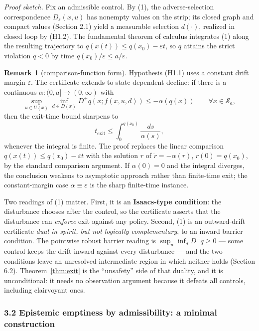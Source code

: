 \documentclass[10pt,twocolumn]{article}
\theoremstyle{definition}
\newtheorem{remark}{Remark}
\begin{document}
\emph{Proof sketch.} Fix an admissible control. By (1), the adverse-selection correspondence \(D_\varepsilon(x,u)\) has nonempty values on the strip; its closed graph and compact values (Section 2.1) yield a measurable selection \(d(\cdot)\), realized in closed loop by (H1.2). The fundamental theorem of calculus integrates (1) along the resulting trajectory to \(q(x(t)) \le q(x_0) - \varepsilon t\), so \(q\) attains the strict violation \(q < 0\) by time \(q(x_0)/\varepsilon \le a/\varepsilon\).

\begin{remark}[comparison-function form]\label{rem:comparison}
Hypothesis (H1.1) uses a constant drift margin \(\varepsilon\). The
certificate extends to state-dependent decline: if there is a continuous
\(\alpha:(0,a]\to(0,\infty)\) with
\[\sup_{u\in U(x)}\inf_{d\in D(x)} D^+q(x; f(x,u,d)) \le -\alpha(q(x)) \qquad \forall x\in\mathcal{S}_a,\]
then the exit-time bound sharpens to
\[t_{\mathrm{exit}} \le \int_0^{q(x_0)} \frac{ds}{\alpha(s)},\]
whenever the integral is finite. The proof replaces the linear comparison
\(q(x(t))\le q(x_0)-\varepsilon t\) with the solution \(r\) of
\(\dot r=-\alpha(r)\), \(r(0)=q(x_0)\), by the standard comparison
argument. If \(\alpha(0)=0\) and the integral diverges, the conclusion
weakens to asymptotic approach rather than finite-time exit; the
constant-margin case \(\alpha\equiv\varepsilon\) is the sharp finite-time
instance.
\end{remark}

Two readings of (1) matter. First, it is an \textbf{Isaacs-type
condition}: the disturbance chooses after the control, so the
certificate asserts that the disturbance can \emph{enforce} exit against
any policy. Second, (1) is an outward-drift certificate \emph{dual in
spirit, but not logically complementary}, to an inward barrier
condition. The pointwise robust barrier reading is
\(\sup_u \inf_d D^+ q \ge 0\) --- some control keeps the drift inward
against every disturbance --- and the two conditions leave an unresolved
intermediate region in which neither holds (Section 6.2). Theorem~\ref{thm:exit} is
the ``unsafety'' side of that duality, and it is unconditional: it needs
no observation argument because it defeats all controls, including
clairvoyant ones.

\subsubsection{3.2 Epistemic emptiness by admissibility: a minimal
construction}\label{epistemic-emptiness-by-admissibility-a-minimal-construction}
\end{document}
